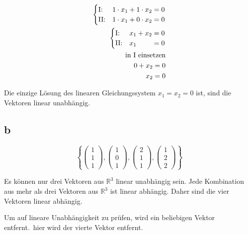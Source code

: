 \begin{align*}
    \begin{cases}
        \text{I:\@}  & 1 \cdot x_1 + 1  \cdot x_2 = 0 \\
        \text{II:\@} & 1 \cdot x_1 + 0 \cdot x_2 = 0
    \end{cases}                                 \\
    \begin{cases}
        \text{I:\@}  & x_1 + x_2 = 0              \\
        \text{II:\@} & x_1 \phantom{{} + x_2} = 0
    \end{cases} \\
    \text{in I einsetzen}                                                         \\
    0 + x_2 = 0                                                                   \\
    x_2 = 0
\end{align*}

Die einzige Lösung des linearen Gleichungssystem $x_1 = x_2 = 0$ ist, sind die
Vektoren linear unabhängig.

\subsection{b}
\[ \left\{ \begin{pmatrix} 1 \\ 1 \\ 1 \end{pmatrix},
    \begin{pmatrix} 1 \\ 0 \\ 1 \end{pmatrix}, \begin{pmatrix} 2 \\ 1 \\ 1 \end{pmatrix},
    \begin{pmatrix} 1 \\ 2 \\ 2 \end{pmatrix} \right\} \]

Es können nur drei Vektoren aus $\mathbb{R}^3$ linear unabhängig sein. Jede
Kombination aus mehr als drei Vektoren aus $\mathbb{R}^3$ ist linear abhängig.
Daher sind die vier Vektoren linear abhängig.

Um auf lineare Unabhängigkeit zu prüfen, wird ein beliebigen Vektor entfernt.\
hier wird der vierte Vektor entfernt.


